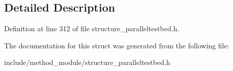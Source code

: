 \subsection{Detailed Description}


Definition at line 312 of file structure\-\_\-paralleltestbed.\-h.



The documentation for this struct was generated from the following file\-:\begin{DoxyCompactItemize}
\item 
include/method\-\_\-module/structure\-\_\-paralleltestbed.\-h\end{DoxyCompactItemize}
